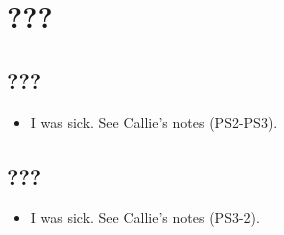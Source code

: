 \documentclass[../notes.tex]{subfiles}
\begin{document}
\chapter{???}
\section{???}
\begin{itemize}
    \item {}I was sick. See Callie's notes (PS2-PS3).
\end{itemize}



\section{???}
\begin{itemize}
    \item {}I was sick. See Callie's notes (PS3-2).
\end{itemize}
\end{document}
